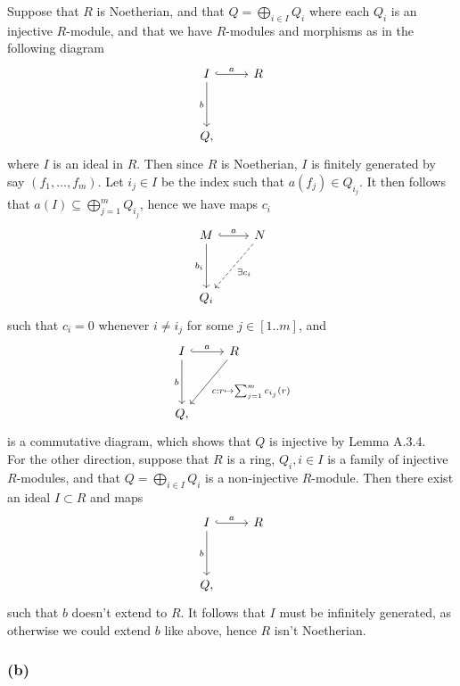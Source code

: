 \documentclass{article}
\theoremstyle{definition}
\begin{document}
Suppose that $R$ is Noetherian, and that $Q = \bigoplus_{i \in I} Q_i$ where
each $Q_i$ is an injective $R$-module, and that we have $R$-modules and
morphisms as in the following diagram
\begin{equation*}
\begin{tikzcd}[row sep=huge]
I \arrow[r, hook, "a"] \arrow[d,swap,"b"] &
R \\
Q,
\end{tikzcd}
\end{equation*}
where $I$ is an ideal in $R$. Then since $R$ is Noetherian, $I$ is finitely
generated by say $(f_1, \ldots, f_m)$. Let $i_j \in I$ be the index such 
that $a(f_j) \in Q_{i_j}$. It then follows that $a(I) \subseteq \bigoplus_{j = 1}^{m} Q_{i_j}$,
hence we have maps $c_i$
\begin{equation*}
\begin{tikzcd}[row sep=huge]
M \arrow[r, hook, "a"] \arrow[d,swap,"b_i"] &
N \arrow[dl, dashed, "\exists c_i"] \\
Q_i
\end{tikzcd}
\end{equation*}
such that $c_i = 0$ whenever $i \not = i_j$ for some $j \in [1..m]$, and 
\begin{equation*}
\begin{tikzcd}[row sep=huge]
I \arrow[r, hook, "a"] \arrow[d,swap,"b"] &
R \arrow[dl, "c : r \mapsto \sum_{j = 1}^{m} c_{i_j}(r)"] \\
Q,
\end{tikzcd}
\end{equation*}
is a commutative diagram, which shows that $Q$ is injective by Lemma A.3.4. \\

For the other direction, suppose that $R$ is a ring, $Q_i, i \in I$ is a family
of injective $R$-modules, and that $Q = \bigoplus_{i \in I} Q_i$ is a
non-injective $R$-module. Then there exist an ideal $I \subset R$ and maps 
\begin{equation*}
\begin{tikzcd}[row sep=huge]
I \arrow[r, hook, "a"] \arrow[d,swap,"b"] &
R \\
Q,
\end{tikzcd}
\end{equation*}
such that $b$ doesn't extend to $R$. It follows that $I$ must be infinitely
generated, as otherwise we could extend $b$ like above, hence $R$ isn't
Noetherian.

\subsubsection*{(b)}
\end{document}
